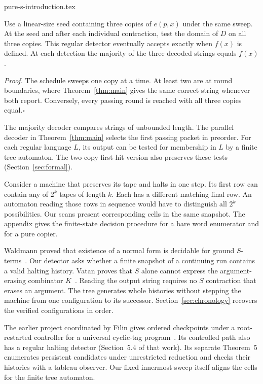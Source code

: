 \begin{filecontents*}[overwrite]{pure-s-introduction.tex}
\begin{samepage}\begin{corollary}\label{cor:majority}
Use a linear-size seed containing three copies of $e(p,x)$ under the same sweep. At the seed and after each individual contraction, test the domain of $D$ on all three copies. This regular detector eventually accepts exactly when $f(x)$ is defined. At each detection the majority of the three decoded strings equals $f(x)$.
\end{corollary}\end{samepage}
\emph{Proof.} The schedule sweeps one copy at a time. At least two are at round boundaries, where Theorem~\ref{thm:main} gives the same correct string whenever both report. Conversely, every passing round is reached with all three copies equal.\hfill$\square$

The majority decoder compares strings of unbounded length. The parallel decoder in Theorem~\ref{thm:main} selects the first passing packet in preorder. For each regular language $L$, its output can be tested for membership in $L$ by a finite tree automaton. The two-copy first-hit version also preserves these tests (Section~\ref{sec:formal}).

Consider a machine that preserves its tape and halts in one step. Its first row can contain any of $2^k$ tapes of length $k$. Each has a different matching final row. An automaton reading those rows in sequence would have to distinguish all $2^k$ possibilities. Our scans present corresponding cells in the same snapshot. The appendix gives the finite-state decision procedure for a bare word enumerator and for a pure copier.

Waldmann proved that existence of a normal form is decidable for ground $S$-terms~\cite{waldmann}. Our detector asks whether a finite snapshot of a continuing run contains a valid halting history. Vatan proves that $S$ alone cannot express the argument-erasing combinator $K$~\cite{vatan}. Reading the output string requires no $S$ contraction that erases an argument. The tree generates whole histories without stepping the machine from one configuration to its successor. Section~\ref{sec:chronology} recovers the verified configurations in order.

The earlier project coordinated by Filin gives ordered checkpoints under a root-restarted controller for a universal cyclic-tag program~\cite[Theorem~1R and Corollary~2.2]{filin}. Its controlled path also has a regular halting detector (Section~5.4 of that work). Its separate Theorem~5 enumerates persistent candidates under unrestricted reduction and checks their histories with a tableau observer. Our fixed innermost sweep itself aligns the cells for the finite tree automaton.
\end{filecontents*}
